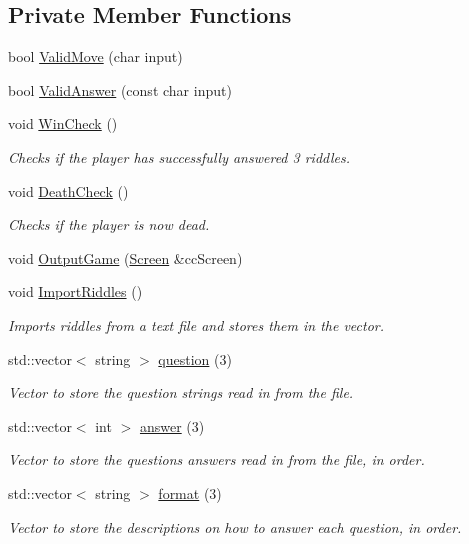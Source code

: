 \subsection*{Private Member Functions}
\begin{DoxyCompactItemize}
\item 
bool \hyperlink{classCodeCracker_a793271a6ea1d8affad8fdddbbd692f7a}{Valid\-Move} (char input)
\item 
bool \hyperlink{classCodeCracker_ae1f112c18049c0ecc3e52bfcf1398ccd}{Valid\-Answer} (const char input)
\item 
void \hyperlink{classCodeCracker_a3177ddb9deb208ac462d55970b112626}{Win\-Check} ()
\begin{DoxyCompactList}\small\item\em Checks if the player has successfully answered 3 riddles. \end{DoxyCompactList}\item 
void \hyperlink{classCodeCracker_a9fd7f74660bef36842fc8293b3d5ed31}{Death\-Check} ()
\begin{DoxyCompactList}\small\item\em Checks if the player is now dead. \end{DoxyCompactList}\item 
void \hyperlink{classCodeCracker_a1b27237e5cac2dbe68c2656a24a9c22e}{Output\-Game} (\hyperlink{classScreen}{Screen} \&cc\-Screen)
\item 
void \hyperlink{classCodeCracker_a13ef45a98032d321c825e7a2c5439a33}{Import\-Riddles} ()
\begin{DoxyCompactList}\small\item\em Imports riddles from a text file and stores them in the vector. \end{DoxyCompactList}\item 
std\-::vector$<$ string $>$ \hyperlink{classCodeCracker_a449d81e70551b8876e8b87abab5d47b5}{question} (3)
\begin{DoxyCompactList}\small\item\em Vector to store the question strings read in from the file. \end{DoxyCompactList}\item 
std\-::vector$<$ int $>$ \hyperlink{classCodeCracker_a169bd6d0f9ba25386dd1d94696cb210a}{answer} (3)
\begin{DoxyCompactList}\small\item\em Vector to store the questions answers read in from the file, in order. \end{DoxyCompactList}\item 
std\-::vector$<$ string $>$ \hyperlink{classCodeCracker_ae485d1778f29749aea98c4137beeb96f}{format} (3)
\begin{DoxyCompactList}\small\item\em Vector to store the descriptions on how to answer each question, in order. \end{DoxyCompactList}\end{DoxyCompactItemize}
